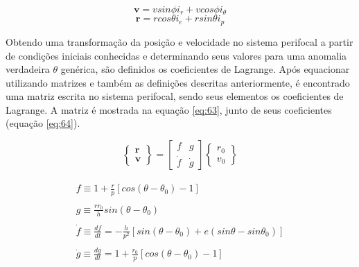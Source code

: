 \begin{equation}
    \textbf{v} = vsin\phi i_{r} + vcos\phi i_{\theta}
    \label{eq:61}
\end{equation}
\begin{equation}
    \textbf{r} = rcos\theta i_{e} + r sin \theta i_{p}
    \label{eq:62}
\end{equation}

Obtendo uma transformação da posição e velocidade no sistema perifocal a partir de condições iniciais conhecidas e determinando seus valores para uma anomalia verdadeira $\theta$ genérica, são definidos os coeficientes de Lagrange. Após equacionar utilizando matrizes e também as definições descritas anteriormente, é encontrado uma matriz escrita no sistema perifocal, sendo seus elementos os coeficientes de Lagrange. A matriz é mostrada na equação \ref{eq:63}, junto de seus coeficientes (equação \ref{eq:64}).

\begin{equation}
\left\{\begin{array}{l}
\textbf{r} \\
\textbf{v} \end{array}\right\} = 
\left[\begin{array}{ll}
f & g \\
\Dot{f} & \Dot{g}
\end{array}\right] 
\left\{\begin{array}{l}
\textbf{$r_{0}$} \\
\textbf{$v_{0}$} 
\end{array}\right\}
\label{eq:63}
\end{equation}


\begin{equation}
\begin{split}
\begin{array}{l}
f \equiv 1 +\frac{r}{p}[cos(\theta - \theta_{0}) -1]\\ \\
g \equiv \frac{rr_{0}}{h}sin(\theta - \theta_{0})  \\ \\
\Dot{f} \equiv \frac{df}{dt} =  -\frac{h}{p^{2}}[sin(\theta - \theta_{0}) + e(sin\theta -sin \theta_{0})]\\ \\
\Dot{g} \equiv \frac{dg}{dt} = 1+ \frac{r_{0}}{p}[cos(\theta - \theta_{0}) -1]  
\end{array}
\label{eq:64}
\end{split}
\end{equation}

